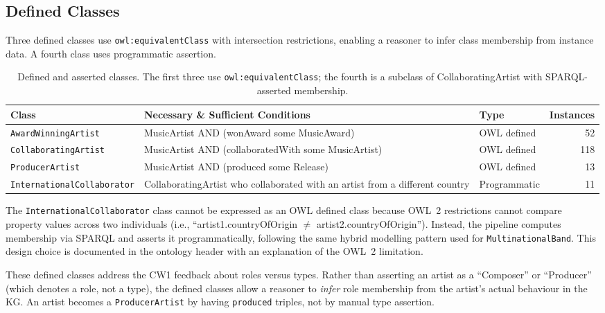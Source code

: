 \subsection{Defined Classes}

Three defined classes use \texttt{owl:equivalentClass} with intersection restrictions, enabling a reasoner to infer class membership from instance data. A fourth class uses programmatic assertion.

\begin{table}[h]
\centering
\small
\begin{tabular}{lp{5cm}lr}
\toprule
\textbf{Class} & \textbf{Necessary \& Sufficient Conditions} & \textbf{Type} & \textbf{Instances} \\
\midrule
\texttt{AwardWinningArtist} & MusicArtist AND (wonAward some MusicAward) & OWL defined & 52 \\
\texttt{CollaboratingArtist} & MusicArtist AND (collaboratedWith some MusicArtist) & OWL defined & 118 \\
\texttt{ProducerArtist} & MusicArtist AND (produced some Release) & OWL defined & 13 \\
\texttt{InternationalCollaborator} & CollaboratingArtist who collaborated with an artist from a different country & Programmatic & 11 \\
\bottomrule
\end{tabular}
\caption{Defined and asserted classes. The first three use \texttt{owl:equivalentClass}; the fourth is a subclass of CollaboratingArtist with SPARQL-asserted membership.}
\end{table}

The \texttt{InternationalCollaborator} class cannot be expressed as an OWL defined class because OWL~2 restrictions cannot compare property values across two individuals (i.e., ``artist1.countryOfOrigin $\neq$ artist2.countryOfOrigin''). Instead, the pipeline computes membership via SPARQL and asserts it programmatically, following the same hybrid modelling pattern used for \texttt{MultinationalBand}. This design choice is documented in the ontology header with an explanation of the OWL~2 limitation.

These defined classes address the CW1 feedback about roles versus types. Rather than asserting an artist as a ``Composer'' or ``Producer'' (which denotes a role, not a type), the defined classes allow a reasoner to \textit{infer} role membership from the artist's actual behaviour in the KG. An artist becomes a \texttt{ProducerArtist} by having \texttt{produced} triples, not by manual type assertion.

